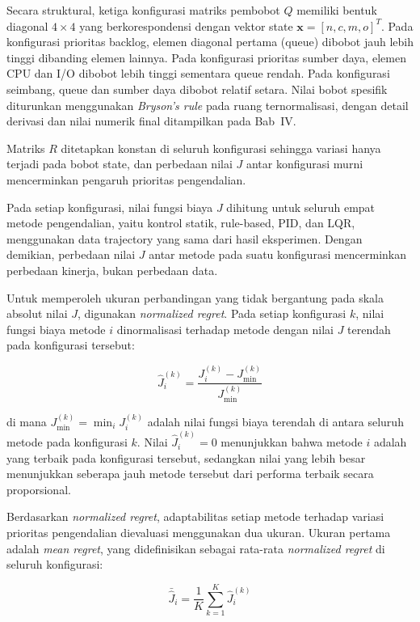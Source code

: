 Secara struktural, ketiga konfigurasi matriks pembobot $Q$ memiliki bentuk diagonal $4\times 4$ yang berkorespondensi dengan vektor state $\mathbf{x} = [n, c, m, o]^T$.
Pada konfigurasi prioritas backlog, elemen diagonal pertama (queue) dibobot jauh lebih tinggi dibanding elemen lainnya.
Pada konfigurasi prioritas sumber daya, elemen CPU dan I/O dibobot lebih tinggi sementara queue rendah.
Pada konfigurasi seimbang, queue dan sumber daya dibobot relatif setara.
Nilai bobot spesifik diturunkan menggunakan \emph{Bryson's rule} pada ruang ternormalisasi, dengan detail derivasi dan nilai numerik final ditampilkan pada Bab~IV.

Matriks $R$ ditetapkan konstan di seluruh konfigurasi sehingga variasi hanya terjadi pada bobot state, dan perbedaan nilai $J$ antar konfigurasi murni mencerminkan pengaruh prioritas pengendalian.

Pada setiap konfigurasi, nilai fungsi biaya $J$ dihitung untuk seluruh empat metode pengendalian, yaitu kontrol statik, rule-based, PID, dan LQR, menggunakan data trajectory yang sama dari hasil eksperimen. Dengan demikian, perbedaan nilai $J$ antar metode pada suatu konfigurasi mencerminkan perbedaan kinerja, bukan perbedaan data.

Untuk memperoleh ukuran perbandingan yang tidak bergantung pada skala absolut nilai $J$, digunakan \emph{normalized regret}. Pada setiap konfigurasi $k$, nilai fungsi biaya metode $i$ dinormalisasi terhadap metode dengan nilai $J$ terendah pada konfigurasi tersebut:

\begin{equation}
    \hat{J}_i^{(k)} = \frac{J_i^{(k)} - J_{\min}^{(k)}}{J_{\min}^{(k)}}
    \label{eq:normalized-regret}
\end{equation}

\noindent di mana $J_{\min}^{(k)} = \min_{i} J_i^{(k)}$ adalah nilai fungsi biaya terendah di antara seluruh metode pada konfigurasi $k$. Nilai $\hat{J}_i^{(k)} = 0$ menunjukkan bahwa metode $i$ adalah yang terbaik pada konfigurasi tersebut, sedangkan nilai yang lebih besar menunjukkan seberapa jauh metode tersebut dari performa terbaik secara proporsional.

Berdasarkan \emph{normalized regret}, adaptabilitas setiap metode terhadap variasi prioritas pengendalian dievaluasi menggunakan dua ukuran. Ukuran pertama adalah \emph{mean regret}, yang didefinisikan sebagai rata-rata \emph{normalized regret} di seluruh konfigurasi:

\begin{equation}
    \bar{\hat{J}}_i = \frac{1}{K} \sum_{k=1}^{K} \hat{J}_i^{(k)}
    \label{eq:mean-regret}
\end{equation}

